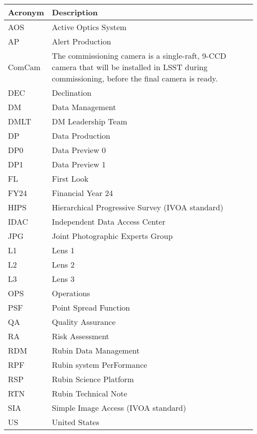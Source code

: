 \addtocounter{table}{-1}
\begin{longtable}{p{}p{}}\hline
\textbf{Acronym} & \textbf{Description}  \\\hline

AOS & Active Optics System \\\hline
AP & Alert Production \\\hline
ComCam & The commissioning camera is a single-raft, 9-CCD camera that will be installed in LSST during commissioning, before the final camera is ready. \\\hline
DEC & Declination \\\hline
DM & Data Management \\\hline
DMLT & DM Leadership Team \\\hline
DP & Data Production \\\hline
DP0 & Data Preview 0 \\\hline
DP1 & Data Preview 1 \\\hline
FL & First Look \\\hline
FY24 & Financial Year 24 \\\hline
HIPS & Hierarchical Progressive Survey (IVOA standard) \\\hline
IDAC & Independent Data Access Center \\\hline
JPG & Joint Photographic Experts Group \\\hline
L1 & Lens 1 \\\hline
L2 & Lens 2 \\\hline
L3 & Lens 3 \\\hline
OPS & Operations \\\hline
PSF & Point Spread Function \\\hline
QA & Quality Assurance \\\hline
RA & Risk Assessment \\\hline
RDM & Rubin Data Management \\\hline
RPF & Rubin system PerFormance \\\hline
RSP & Rubin Science Platform \\\hline
RTN & Rubin Technical Note \\\hline
SIA & Simple Image Access (IVOA standard) \\\hline
US & United States \\\hline
\end{longtable}
